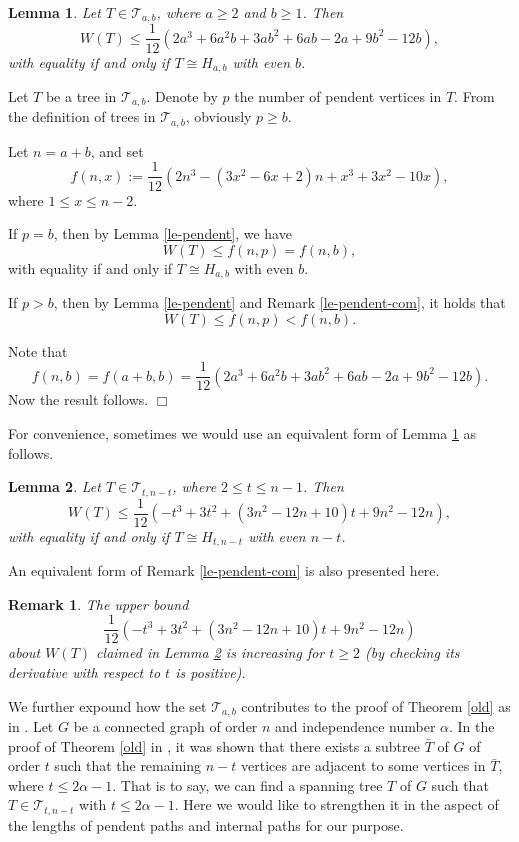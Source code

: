 \documentclass[12pt]{article}
\newtheorem{Remark}{Remark}[section]
\newtheorem{Lemma}{Lemma}[section]
\newenvironment {Proof} {\noindent {\bf Proof.}}{\hspace*{\fill}$\Box$\par\vspace{4mm}}
\begin{document}
\begin{Lemma} \cite{Muk14} \label{old-le}
Let $T \in \mathcal{T}_{a,b}$, where $a \ge 2$ and $b \ge 1$. Then
$$
W (T) \le  \frac{1}{12}(2 a ^3 + 6a^2 b + 3a b^2 + 6a b -2 a + 9 b^2 - 12 b  ),
$$
with equality if and only if $T \cong H_{a,b}$ with even $b$.
\end{Lemma}

\begin{Proof}
Let $T$ be a tree in $\mathcal{T}_{a,b}$. Denote by $p$ the number of pendent vertices in $T$. From the definition of trees in $\mathcal{T}_{a,b}$, obviously $p \ge b$.

Let $n=a+b$, and set
$$
f(n,x) := \frac{1}{12} (2n^3 -(3x^2-6x+2)n+x^3+3x^2-10x),
$$
where $1 \le x \le n- 2$.

If $p = b$, then by Lemma \ref{le-pendent}, we have
$$
W(T) \le f(n,p) = f(n,b),
$$
with equality if and only if $T \cong H_{a,b}$ with even $b$.

If $p > b$, then by Lemma \ref{le-pendent} and Remark \ref{le-pendent-com}, it holds that
$$
W(T) \le f(n,p) < f(n,b).
$$

Note that
$$
f(n,b) = f(a+b,b) = \frac{1}{12}(2 a ^3 + 6a^2 b + 3a b^2 + 6a b -2 a + 9 b^2 - 12 b  ).
$$
Now the result follows.
\end{Proof}

For convenience, sometimes we would use an equivalent form of Lemma \ref{old-le} as follows.

\begin{Lemma}  \label{old-le-eq}
Let $T \in \mathcal{T}_{t,n-t}$, where $2 \le t \le n - 1$. Then
$$
W (T) \le  \frac{1}{12}( -t^3 + 3t^2 + (3n^2 - 12n + 10)t + 9n^2 - 12n),
$$
with equality if and only if $T \cong H_{t,n-t}$ with even $n-t$.
\end{Lemma}

An equivalent form of Remark \ref{le-pendent-com} is also presented here.

\begin{Remark} \label{remark}
The upper bound
$$
\frac{1}{12}( -t^3 + 3t^2 + (3n^2 - 12n + 10)t + 9n^2 - 12n)
$$
about $W(T)$ claimed in Lemma \ref{old-le-eq} is increasing for $t \ge 2$ (by checking its derivative with respect to $t$ is positive).
\end{Remark}

We further expound how the set $\mathcal{T}_{a,b}$ contributes to the proof of Theorem \ref{old} as in \cite{Muk14}.
Let $G$ be a connected graph of order $n$ and independence number $\alpha$. In the proof of Theorem \ref{old} in \cite{Muk14}, it was shown that there exists a subtree $\bar{T}$ of $G$ of order $t$ such that the remaining $n-t$ vertices are adjacent to some vertices in $\bar{T}$, where $t \le 2 \alpha - 1$. That is to say, we can find a spanning tree $T$ of $G$ such that $T \in \mathcal{T}_{t, n-t}$ with $t \le 2 \alpha - 1$.
Here we would like to strengthen it in the aspect of the lengths of pendent paths and  internal paths for our purpose.
\end{document}
